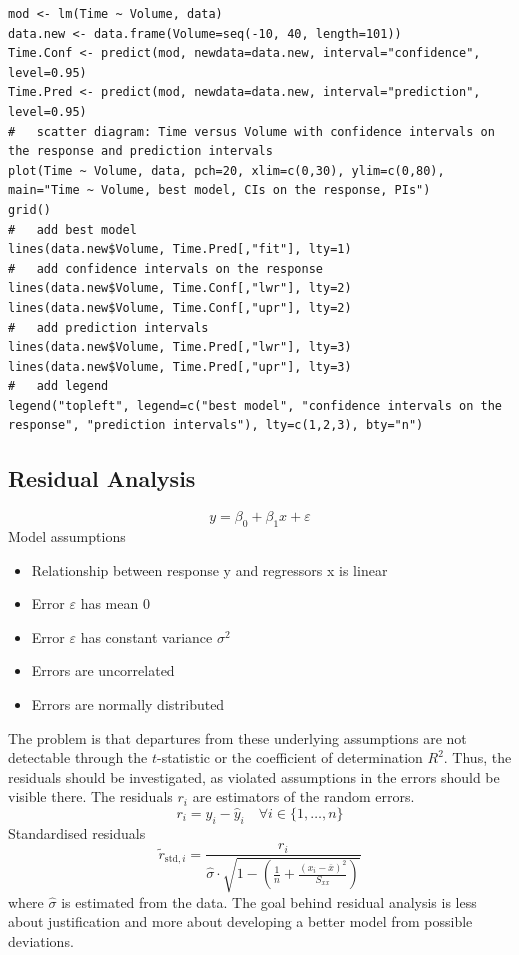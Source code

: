 \documentclass[11pt]{article}
\theoremstyle{definition}
\newcommand*\samplemean[1]{\overline{#1}}
\begin{document}
\begin{verbatim}
mod <- lm(Time ~ Volume, data)
data.new <- data.frame(Volume=seq(-10, 40, length=101))
Time.Conf <- predict(mod, newdata=data.new, interval="confidence", level=0.95)
Time.Pred <- predict(mod, newdata=data.new, interval="prediction", level=0.95)
#   scatter diagram: Time versus Volume with confidence intervals on the response and prediction intervals
plot(Time ~ Volume, data, pch=20, xlim=c(0,30), ylim=c(0,80), main="Time ~ Volume, best model, CIs on the response, PIs")
grid()
#   add best model
lines(data.new$Volume, Time.Pred[,"fit"], lty=1)
#   add confidence intervals on the response
lines(data.new$Volume, Time.Conf[,"lwr"], lty=2)
lines(data.new$Volume, Time.Conf[,"upr"], lty=2)
#   add prediction intervals
lines(data.new$Volume, Time.Pred[,"lwr"], lty=3)
lines(data.new$Volume, Time.Pred[,"upr"], lty=3)
#   add legend
legend("topleft", legend=c("best model", "confidence intervals on the response", "prediction intervals"), lty=c(1,2,3), bty="n")
\end{verbatim}

\subsection{Residual Analysis}
\begin{equation*}
	y = \beta_0 + \beta_1 x + \varepsilon
\end{equation*}
Model assumptions
\begin{itemize}
	\item Relationship between response y and regressors x is linear
	\item Error $\varepsilon$ has mean $0$
	\item Error $\varepsilon$ has constant variance $\sigma^2$
	\item Errors are uncorrelated
	\item Errors are normally distributed
\end{itemize}
The problem is that departures from these underlying assumptions are not detectable through the $t$-statistic or the coefficient of determination $R^2$. Thus, the residuals should be investigated, as violated assumptions in the errors should be visible there. The residuals $r_i$ are estimators of the random errors.
\begin{equation*}
	r_i = y_i - \hat{y}_i \quad\forall i\in\{1,\dots,n\}
\end{equation*}
Standardised residuals
\begin{equation*}
	\tilde{r}_{\text{std}, i} = \frac{r_i}{\hat{\sigma} \cdot \sqrt{1-\left(\frac{1}{n} + \frac{(x_i - \samplemean{x})^2}{S_{xx}}\right)}}
\end{equation*}
where $\hat{\sigma}$ is estimated from the data. The goal behind residual analysis is less about justification and more about developing a better model from possible deviations.
\end{document}
